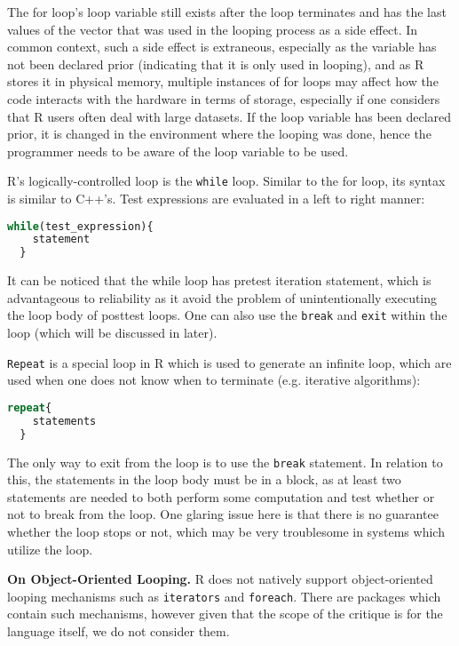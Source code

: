 \documentclass[12pt]{article}
\begin{document}
The for loop's loop variable still exists after the loop terminates and has the last values of the vector that was used in the looping process as a side effect. In common context, such a side effect is extraneous, especially as the variable has not been declared prior (indicating that it is only used in looping), and as R stores it in physical memory, multiple instances of for loops may affect how the code interacts with the hardware in terms of storage, especially if one considers that R users often deal with large datasets. If the loop variable has been declared prior, it is changed in the environment where the looping was done, hence the programmer needs to be aware of the loop variable to be used.

R's logically-controlled loop is the \texttt{while} loop. Similar to the for loop, its syntax is similar to C++'s. Test expressions are evaluated in a left to right manner:

\begin{lstlisting}[language=R ]
  while(test_expression){
    statement
  }
\end{lstlisting}

It can be noticed that the while loop has pretest iteration statement, which is advantageous to reliability as it avoid the problem of unintentionally executing the loop body of posttest loops. One can also use the \texttt{break} and \texttt{exit} within the loop (which will be discussed in later).

\texttt{Repeat} is a special loop in R which is used to generate an infinite loop, which are used when one does not know when to terminate (e.g. iterative algorithms):

\begin{lstlisting}[language=R ]
  repeat{
    statements
  }
\end{lstlisting}

The only way to exit from the loop is to use the \texttt{break} statement. In relation to this, the statements in the loop body must be in a block, as at least two statements are needed to both perform some computation and test whether or not to break from the loop. One glaring issue here is that there is no guarantee whether the loop stops or not, which may be very troublesome in systems which utilize the loop.

\textbf{On Object-Oriented Looping.} R does not natively support object-oriented looping mechanisms such as \texttt{iterators} and \texttt{foreach}. There are packages which contain such mechanisms, however given that the scope of the critique is for the language itself, we do not consider them.
\end{document}
